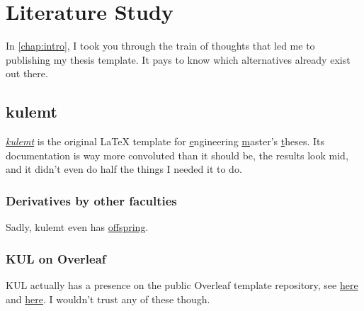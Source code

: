 \chapter{Literature Study}\label{chap:literature}
In \autoref{chap:intro}, I took you through the train of thoughts that led me to publishing my thesis template. It pays to know which alternatives already exist out there.

\section{kulemt}
\href{https://eng.kuleuven.be/docs/kulemt}{\emph*{kulemt}} is the original \LaTeX{} template for \underline{e}ngineering \underline{m}aster's \underline{t}heses. Its documentation is way more convoluted than it should be, the results look mid, and it didn't even do half the things I needed it to do.

\subsection{Derivatives by other faculties}
Sadly, kulemt even has \href{https://github.com/KatelijneCaerts/Latex-template-Wetenschappen}{offspring}.

\subsection{KUL on Overleaf}
KUL actually has a presence on the public Overleaf template repository, see \href{https://www.overleaf.com/latex/templates/ku-leuven-faculty-of-engineering-science-masters-thesis-template/xbjfxrbspkvs}{here} and \href{https://www.overleaf.com/latex/templates/tagged/ku-leuven}{here}. I wouldn't trust any of these though.
